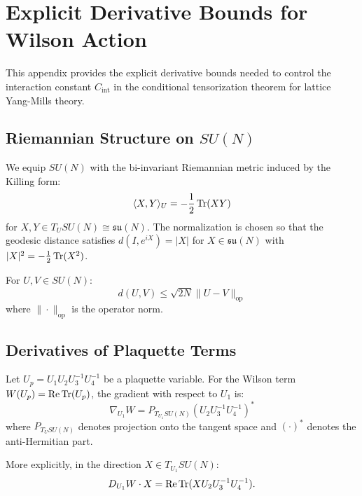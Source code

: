 \section{Explicit Derivative Bounds for Wilson Action}
\label{sec:wilson-derivatives}

This appendix provides the explicit derivative bounds needed to control the interaction constant $C_{\mathrm{int}}$ in the conditional tensorization theorem for lattice Yang-Mills theory.

\subsection{Riemannian Structure on \texorpdfstring{$SU(N)$}{SU(N)}}

\begin{definition}
We equip $SU(N)$ with the bi-invariant Riemannian metric induced by the Killing form:
\begin{equation}
    \langle X, Y \rangle_U = -\frac{1}{2} \operatorname{Tr}(X Y)
\end{equation}
for $X, Y \in T_U SU(N) \cong \mathfrak{su}(N)$. The normalization is chosen so that the geodesic distance satisfies $d(I, e^{iX}) = |X|$ for $X \in \mathfrak{su}(N)$ with $|X|^2 = -\frac{1}{2}\operatorname{Tr}(X^2)$.
\end{definition}

\begin{lemma}
For $U, V \in SU(N)$:
\begin{equation}
    d(U, V) \leq \sqrt{2N} \|U - V\|_{\mathrm{op}}
\end{equation}
where $\|\cdot\|_{\mathrm{op}}$ is the operator norm.
\end{lemma}

\subsection{Derivatives of Plaquette Terms}

\begin{lemma}\label{lem:single-derivative}
Let $U_p = U_1 U_2 U_3^{-1} U_4^{-1}$ be a plaquette variable. For the Wilson term $W(U_p) = \operatorname{Re} \operatorname{Tr}(U_p)$, the gradient with respect to $U_1$ is:
\begin{equation}
    \nabla_{U_1} W = P_{T_{U_1} SU(N)} \left( U_2 U_3^{-1} U_4^{-1} \right)^*
\end{equation}
where $P_{T_U SU(N)}$ denotes projection onto the tangent space and $(\cdot)^*$ denotes the anti-Hermitian part. 

More explicitly, in the direction $X \in T_{U_1} SU(N)$:
\begin{equation}
    D_{U_1} W \cdot X = \operatorname{Re} \operatorname{Tr}(X U_2 U_3^{-1} U_4^{-1}).
\end{equation}
\end{lemma}

